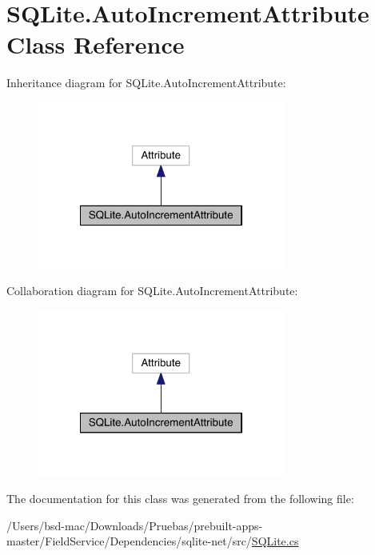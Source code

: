 \hypertarget{class_s_q_lite_1_1_auto_increment_attribute}{\section{S\+Q\+Lite.\+Auto\+Increment\+Attribute Class Reference}
\label{class_s_q_lite_1_1_auto_increment_attribute}
}


Inheritance diagram for S\+Q\+Lite.\+Auto\+Increment\+Attribute\+:
\nopagebreak
\begin{figure}[H]
\begin{center}
\leavevmode
\includegraphics[width=230pt]{class_s_q_lite_1_1_auto_increment_attribute__inherit__graph}
\end{center}
\end{figure}


Collaboration diagram for S\+Q\+Lite.\+Auto\+Increment\+Attribute\+:
\nopagebreak
\begin{figure}[H]
\begin{center}
\leavevmode
\includegraphics[width=230pt]{class_s_q_lite_1_1_auto_increment_attribute__coll__graph}
\end{center}
\end{figure}


The documentation for this class was generated from the following file\+:\begin{DoxyCompactItemize}
\item 
/\+Users/bsd-\/mac/\+Downloads/\+Pruebas/prebuilt-\/apps-\/master/\+Field\+Service/\+Dependencies/sqlite-\/net/src/\hyperlink{_s_q_lite_8cs}{S\+Q\+Lite.\+cs}\end{DoxyCompactItemize}
